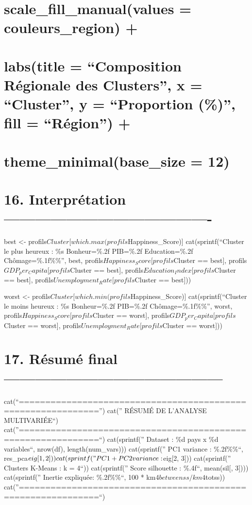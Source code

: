 \documentclass[
]{article}
\begin{document}
\section{scale\_fill\_manual(values = couleurs\_region)
+}\label{scale_fill_manualvalues-couleurs_region}

\section{labs(title = ``Composition Régionale des Clusters'', x =
``Cluster'', y = ``Proportion (\%)'', fill = ``Région'')
+}\label{labstitle-composition-ruxe9gionale-des-clusters-x-cluster-y-proportion-fill-ruxe9gion}

\section{theme\_minimal(base\_size =
12)}\label{theme_minimalbase_size-12-4}

\section{16. Interprétation
----------------------------------------}\label{interpruxe9tation--}

best \textless- profils\(Cluster[which.max(profils\)Happiness\_Score){]}
cat(sprintf(``Cluster le plus heureux : \%s \textbar{} Bonheur=\%.2f
\textbar{} PIB=\%.2f \textbar{} Education=\%.2f \textbar{}
Chômage=\%.1f\%\%\n'', best, profils\(Happiness_Score[profils\)Cluster
== best{]}, profils\(GDP_per_Capita[profils\)Cluster == best{]},
profils\(Education_Index[profils\)Cluster == best{]},
profils\(Unemployment_Rate[profils\)Cluster == best{]}))

worst \textless-
profils\(Cluster[which.min(profils\)Happiness\_Score){]}
cat(sprintf(``Cluster le moins heureux : \%s \textbar{} Bonheur=\%.2f
\textbar{} PIB=\%.2f \textbar{} Chômage=\%.1f\%\%\n'', worst,
profils\(Happiness_Score[profils\)Cluster == worst{]},
profils\(GDP_per_Capita[profils\)Cluster == worst{]},
profils\(Unemployment_Rate[profils\)Cluster == worst{]}))

\section{17. Résumé final
------------------------------------------}\label{ruxe9sumuxe9-final}

cat(``\n=============================================================\n'')
cat('' RÉSUMÉ DE L'ANALYSE MULTIVARIÉE\n``)
cat(''=============================================================\n``)
cat(sprintf('' Dataset : \%d pays x \%d variables\n``, nrow(df),
length(num\_vars))) cat(sprintf('' PC1 variance : \%.2f\%\%\n``,
res\_pca\(eig[1, 2]))
cat(sprintf("  PC1+PC2 variance : %
\)eig{[}2, 3{]})) cat(sprintf('' Clusters K-Means : k = 4\n``))
cat(sprintf('' Score silhouette : \%.4f\n``, mean(sil{[}, 3{]})))
cat(sprintf('' Inertie expliquée: \%.2f\%\%\n``, 100 *
km4\(betweenss / km4\)totss))
cat(''=============================================================\n``)
\end{document}
